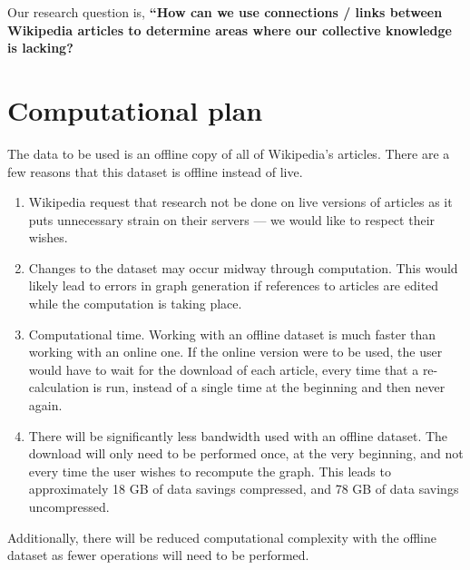\documentclass[fontsize=12pt]{article}
\begin{document}
\begin{multicols}{2}
    Our research question is, \textbf{``How can we use connections / links between Wikipedia articles to determine areas where our collective knowledge is lacking?}



    \section{Computational plan}

    The data to be used is an offline copy of all of Wikipedia's articles.
    There are a few reasons that this dataset is offline instead of live.
    \begin{enumerate}
        \item Wikipedia request that research not be done on live versions of articles as it puts unnecessary strain on their servers --- we would like to respect their wishes.
        \item Changes to the dataset may occur midway through computation.
        This would likely lead to errors in graph generation if references to articles are edited while the computation is taking place.
        \item Computational time.
        Working with an offline dataset is much faster than working with an online one.
        If the online version were to be used, the user would have to wait for the download of each article, every time that a re-calculation is run, instead of a single time at the beginning and then never again.
        \item There will be significantly less bandwidth used with an offline dataset.
        The download will only need to be performed once, at the very beginning, and not every time the user wishes to recompute the graph.
        This leads to approximately 18 GB of data savings compressed, and 78 GB of data savings uncompressed.
    \end{enumerate}
    Additionally, there will be reduced computational complexity with the offline dataset as fewer operations will need to be performed.


\end{multicols}
\end{document}
